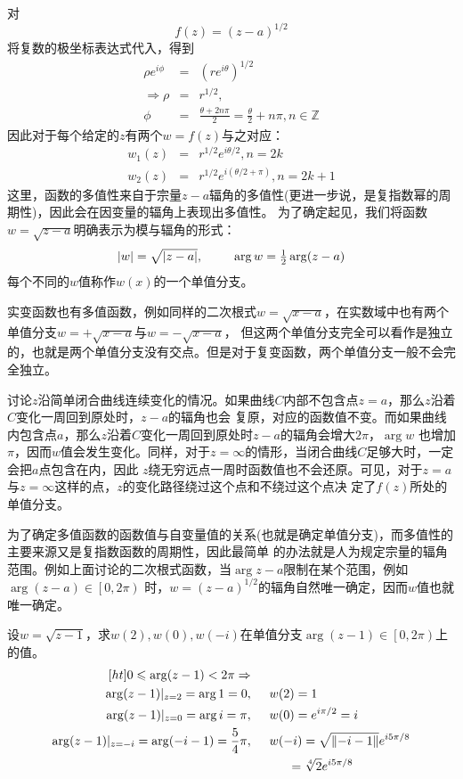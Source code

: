 \documentclass[UTF8]{ctexart}
\begin{document}
对
\[ f (z) = (z - a)^{1 / 2} \]
将复数的极坐标表达式代入，得到
\begin{eqnarray*}
  \rho e^{i \phi} & = & (r e^{i \theta})^{1 / 2}\\
  \Rightarrow \rho & = & r^{1 / 2},\\
  \phi & = & \frac{\theta + 2 n \pi}{2} = \frac{\theta}{2} + n \pi, n \in
  \mathbb{Z}
\end{eqnarray*}
因此对于每个给定的$z$有两个$w = f (z)$与之对应：
\begin{eqnarray*}
  w_1 (z) & = & r^{1 / 2} e^{i \theta / 2}, n = 2 k\\
  w_2 (z) & = & r^{1 / 2} e^{i (\theta / 2 + \pi)}, n = 2 k + 1
\end{eqnarray*}
这里，函数的多值性来自于宗量$z-a$辐角的多值性(更进一步说，是复指数幂的周期性)，因此会在因变量的辐角上表现出多值性。
为了确定起见，我们将函数$w=\sqrt{z-a}$明确表示为模与辐角的形式：
\begin{equation}
  \begin{array}{cc}
    |w|=\sqrt{|z-a|},\indent &\arg w=\frac{1}{2}\arg(z-a)
  \end{array}
\end{equation}
每个不同的$w$值称作$w(x)$的一个单值分支。

实变函数也有多值函数，例如同样的二次根式$w=\sqrt{x-a}$，在实数域中也有两个单值分支$w=+\sqrt{x-a}$与$w=-\sqrt{x-a}$，
但这两个单值分支完全可以看作是独立的，也就是两个单值分支没有交点。但是对于复变函数，两个单值分支一般不会完全独立。

讨论$z$沿简单闭合曲线连续变化的情况。如果曲线$C$内部不包含点$z=a$，那么$z$沿着$C$变化一周回到原处时，$z-a$的辐角也会
复原，对应的函数值不变。而如果曲线内包含点$a$，那么$z$沿着$C$变化一周回到原处时$z-a$的辐角会增大$2\pi$，$\arg w$
也增加$\pi$，因而$w$值会发生变化。同样，对于$z=\infty$的情形，当闭合曲线$C$足够大时，一定会把$a$点包含在内，因此
$z$绕无穷远点一周时函数值也不会还原。可见，对于$z=a$与$z=\infty$这样的点，$z$的变化路径绕过这个点和不绕过这个点决
定了$f(z)$所处的单值分支。

为了确定多值函数的函数值与自变量值的关系(也就是确定单值分支)，而多值性的主要来源又是复指数函数的周期性，因此最简单
的办法就是人为规定宗量的辐角范围。例如上面讨论的二次根式函数，当$\arg z-a$限制在某个范围，例如$\arg(z-a)\in \left[0,2\pi\right)$
时，$w=(z-a)^{1/2}$的辐角自然唯一确定，因而$w$值也就唯一确定。

  设$w=\sqrt{z-1}$，求$w(2),w(0),w(-i)$在单值分支$\arg (z-1)\in\left[0,2\pi\right)$上的值。
  \begin{equation}
    \begin{aligned}
      [ht]
      0\leqslant\arg (z-1)<2\pi\Rightarrow& \\
    \arg(z-1)|_{z=2}=\arg 1=0,&\indent w(2)=1 \\
    \arg(z-1)|_{z=0}=\arg i=\pi,&\indent w(0)=e^{i\pi/2}=i \\
    \arg(z-1)|_{z=-i}=\arg(-i-1)=\frac{5}{4}\pi,&\indent w(-i)=\sqrt{\left\|-i-1 \right\| }e^{i5\pi/8} \\
    &\indent\indent =\sqrt[4]{2}e^{i5\pi/8}
    \end{aligned}
  \end{equation}
\end{document}
